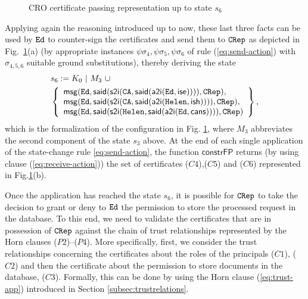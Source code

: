 \documentclass[conference]{llncs}
\newcommand{\theCA}{\ensuremath \mathtt{CA}}
\newcommand{\Ed}{\ensuremath \mathtt{Ed}}
\newcommand{\Helen}{\ensuremath \mathtt{Helen}}
\newcommand{\CRep}{\ensuremath \mathtt{CRep}}
\newcommand{\canstoredoc}{\ensuremath \mathsf{cans}}
\newcommand{\ishead}{\ensuremath \mathsf{ish}}
\newcommand{\isemployee}{\ensuremath \mathsf{ise}}
\newcommand{\msg}{\ensuremath \mathsf{msg}}
\newcommand{\atoi}{\ensuremath \mathsf{a2i}}
\newcommand{\stoi}{\ensuremath \mathsf{s2i}}
\newcommand{\said}{\ensuremath \mathsf{said}}
\newcommand{\CRO}{CRO}
\begin{document}
{\begin{figure}[t] \center
 \qquad\qquad\qquad
{}\qquad\qquad 
\caption{\CRO{} certificate passing representation up to state $s_6$ \label{fig:CRO2}}
\end{figure}

Applying again the reasoning introduced up to now, 
these last three facts can be used by $\Ed$ to counter-sign the
  certificates and send them to $\CRep$ as depicted in
  Fig.~\ref{fig:CRO2}(a) (by appropriate instances $\psi\sigma_4, \psi\sigma_5, \psi\sigma_6$ of rule
  (\ref{eq:send-action}) with $\sigma_{4,5,6}$ suitable ground substitutions), thereby deriving the
  state
  \begin{align*}
  &  s_6:= K_0 ~|~ 
    M_3 ~\cup \\
   &   \left\{ 
    \begin{array}{l}
      \msg(\Ed,\said(\stoi(\theCA, \said(\atoi(\Ed,\isemployee)))),\CRep), \\
      \msg(\Ed,\said(\stoi(\theCA, \said(\atoi(\Helen, \ishead)))),\CRep), \\
      \msg(\Ed,\said(\stoi(\Helen, \said(\atoi(\Ed, \canstoredoc)))),\CRep) 
    \end{array}
    \right\},
  \end{align*} 
  which is the formalization of the configuration in Fig. \ref{fig:CRO2}, where $M_3$ abbreviates the second component of the state $s_3$ above. 
At the end of each single application of the state-change rule \eqref{eq:send-action}, the function $\mathsf{constrFP}$
returns (by using clause (\ref{eq:receive-action})) the set of certificates ($C4$),($C5$) and ($C6$) represented in Fig.\ref{fig:CRO2}(b). 

 Once the application has reached the state $s_6$, it is possible for $\CRep$ to
 take the decision to grant or deny to $\Ed$
the permission to store the processed request in the database.
To this end, we need to validate the certificates that are in possession of
$\CRep$ against the chain of trust relationships represented by the Horn
clauses ($P2$)--($P4$). More specifically, first, we consider the trust
relationships concerning the certificates about the roles of the
principals ($C1$), ($C2$) and then the certificate about the permission to store
documents in the database, ($C3$). Formally, this can be done by using the Horn
clause (\ref{eq:trust-app}) introduced in Section \ref{subsec:trustrelations}.  

}
\end{document}
